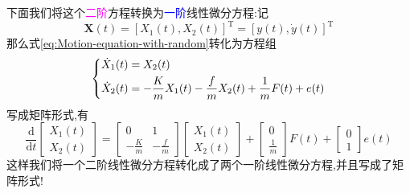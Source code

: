 \documentclass[cn,10pt,citestyle=gb7714-2015,bibstyle=gb7714-2015]{elegantbook}
\newcommand{\mT}{\mathrm{T}}
\begin{document}
下面我们将这个\textcolor{magenta}{二阶}方程转换为\textcolor{blue}{一阶}线性微分方程:记
\[
    \bm{X}(t)=[X_1(t),X_2(t)]^\mT=[y(t),\dot{y}(t)]^\mT
\]
那么式\eqref{eq:Motion-equation-with-random}转化为方程组
\begin{equation}
  \begin{dcases}
    \dot{X}_1(t)=X_2(t)\\
    \dot{X}_2(t)=-\frac{K}{m}X_1(t)-\frac{f}{m}X_2(t)+\frac{1}{m}F(t)+e(t)
  \end{dcases}
\end{equation}
写成矩阵形式,有
\begin{equation}
  \frac{\mathrm{d}}{\mathrm{d}t}\begin{bmatrix}
    X_1(t)\\
    X_2(t)
  \end{bmatrix}=
  \begin{bmatrix}
    0&1\\
    -\frac{K}{m}&-\frac{f}{m}
  \end{bmatrix}
  \begin{bmatrix}
    X_1(t)\\
    X_2(t)
  \end{bmatrix}+
  \begin{bmatrix}
    0\\
    \frac{1}{m}
  \end{bmatrix}F(t)+
  \begin{bmatrix}
    0\\1
  \end{bmatrix}e(t)
\end{equation}
这样我们将一个二阶线性微分方程转化成了两个一阶线性微分方程,并且写成了矩阵形式!
\end{document}
